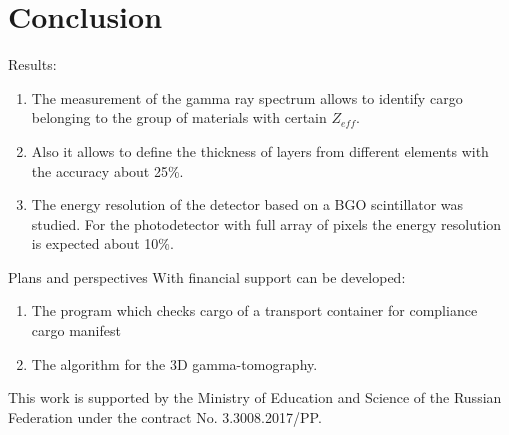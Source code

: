\documentclass[a4paper]{panl}
\begin{document}
\section*{Conclusion}
Results:   
    \begin{enumerate}
        \item The measurement of the gamma ray spectrum allows to identify cargo belonging to the group of materials with certain $Z_{eff}$.
        \item Also it allows to define the thickness of layers from different elements with the accuracy about 25\%.
        \item The energy resolution of the detector based on a BGO scintillator was studied.  For the photodetector with full array of pixels the energy resolution is expected about 10\%.
    \end{enumerate}
Plans and perspectives
    With financial support can be developed:
    \begin{enumerate}
        \item The program which checks cargo of a transport container  for compliance cargo manifest
        \item The algorithm for the 3D gamma-tomography.
    \end{enumerate}

This work is supported by the Ministry of Education and Science of the Russian Federation under the contract No. 3.3008.2017/PP.






\end{document}

